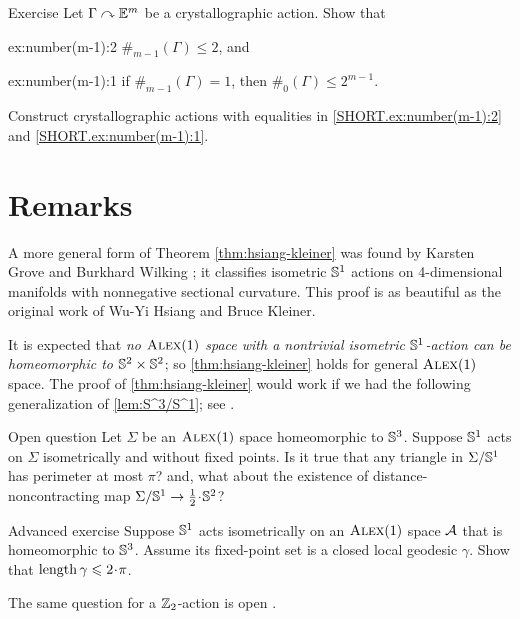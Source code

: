 \begin{thm}{Exercise}\label{ex:number(m-1)}
Let $\Gamma\curvearrowright \mathbb{E}^m$ be a crystallographic action.
Show that
\begin{subthm}{ex:number(m-1):2}
$\#_{m-1}(\Gamma)\le 2$, and
\end{subthm}

\begin{subthm}{ex:number(m-1):1}
if $\#_{m-1}(\Gamma)=1$, then $\#_0(\Gamma)\le 2^{m-1}$.
\end{subthm}

Construct  crystallographic actions with equalities in \ref{SHORT.ex:number(m-1):2} and \ref{SHORT.ex:number(m-1):1}.
\end{thm}

\section{Remarks}

A more general form of Theorem \ref{thm:hsiang-kleiner} was found by Karsten Grove and Burkhard Wilking \cite{grove-wilking};
it classifies isometric $\mathbb{S}^1$ actions on  4-dimensional manifolds with nonnegative sectional curvature.
This proof is as beautiful as the original work of Wu-Yi Hsiang and Bruce Kleiner.

It is expected that \textit{no $\textsc{Alex}(1)$ space with a nontrivial isometric $\mathbb{S}^1$-action can be homeomorphic to $\mathbb{S}^2\times\mathbb{S}^2$};
so \ref{thm:hsiang-kleiner} holds for general $\textsc{Alex}(1)$ space.
The proof of \ref{thm:hsiang-kleiner} would work if we had the following generalization of \ref{lem:S^3/S^1};
see \cite{harvey-searle}.

\begin{thm}{Open question}
Let $\Sigma$ be an $\textsc{Alex}(1)$ space homeomorphic to $\mathbb{S}^3$.
Suppose $\mathbb{S}^1$ acts on $\Sigma$ isometrically and without fixed points.
Is it true that any triangle in $\Sigma/\mathbb{S}^1$ has perimeter at most $\pi$?
and, what about the existence of distance-noncontracting map $\Sigma/\SSS^1\to \tfrac12\cdot\SSS^2$?
\end{thm}


\begin{thm}{Advanced exercise}\label{ex:S1actsS3}
Suppose $\mathbb{S}^1$ acts isometrically on an $\textsc{Alex}(1)$ space $\mathcal{A}$ that is homeomorphic to $\mathbb{S}^3$.
Assume its fixed-point set is a closed local geodesic $\gamma$.
Show that $\length\gamma\le2\cdot\pi$.
\end{thm}

The same question for a $\mathbb{Z}_2$-action is open \cite{petrunin-involution}.

